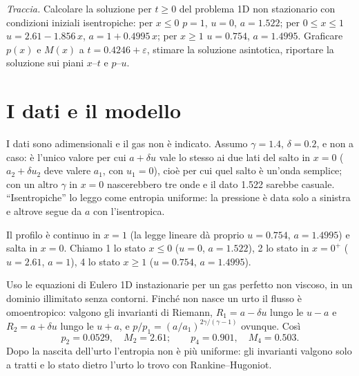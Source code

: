 

\graphicspath{{../../svolgimenti/2021-09-14_B65-E01_dati_iniziali_isentropici/figure/}}

\newcommand{\uma}{u-a}
\newcommand{\upa}{u+a}



\maketitle

\emph{Traccia.} Calcolare la soluzione per $t\ge0$ del problema 1D non stazionario con condizioni iniziali
isentropiche: per $x\le0$ $p=1$, $u=0$, $a=\num{1.522}$; per $0\le x\le1$ $u=\num{2.61}-\num{1.856}\,x$,
$a=1+\num{0.4995}\,x$; per $x\ge1$ $u=\num{0.754}$, $a=\num{1.4995}$. Graficare $p(x)$ e $M(x)$ a
$t=\num{0.4246}+\varepsilon$, stimare la soluzione asintotica, riportare la soluzione sui piani $x$--$t$ e $p$--$u$.

\section*{I dati e il modello}
I dati sono adimensionali e il gas non è indicato. Assumo $\gamma=\num{1.4}$, $\delta=\num{0.2}$, e non a caso:
è l'unico valore per cui $a+\delta u$ vale lo stesso ai due lati del salto in $x=0$ ($a_2+\delta u_2$ deve valere
$a_1$, con $u_1=0$), cioè per cui quel salto è un'onda semplice; con un altro $\gamma$ in $x=0$ nascerebbero tre
onde e il dato \num{1.522} sarebbe casuale. ``Isentropiche'' lo leggo come entropia uniforme: la pressione è data
solo a sinistra e altrove segue da $a$ con l'isentropica.

Il profilo è continuo in $x=1$ (la legge lineare dà proprio $u=\num{0.754}$, $a=\num{1.4995}$) e salta in $x=0$.
Chiamo 1 lo stato $x\le0$ ($u=0$, $a=\num{1.522}$), 2 lo stato in $x=0^+$ ($u=\num{2.61}$, $a=1$), 4 lo stato
$x\ge1$ ($u=\num{0.754}$, $a=\num{1.4995}$).

Uso le equazioni di Eulero 1D instazionarie per un gas perfetto non viscoso, in un dominio illimitato senza
contorni. Finché non nasce un urto il flusso è omoentropico: valgono gli invarianti di Riemann, $R_1=a-\delta u$
lungo le $\uma$ e $R_2=a+\delta u$ lungo le $\upa$, e $p/p_1=(a/a_1)^{2\gamma/(\gamma-1)}$ ovunque. Così
\[
p_2=\num{0.0529},\quad M_2=\num{2.61};\qquad p_4=\num{0.901},\quad M_4=\num{0.503}.
\]
Dopo la nascita dell'urto l'entropia non è più uniforme: gli invarianti valgono solo a tratti e lo stato dietro
l'urto lo trovo con Rankine--Hugoniot.

